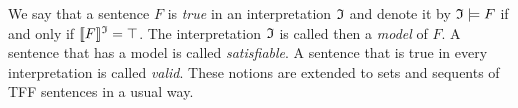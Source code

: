 We say that a sentence $F$ is {\em true} in an interpretation $\mathfrak{I}$
and denote it by $\mathfrak{I} \models F$ if and only if $\llbracket F\rrbracket^{\mathfrak{I}} = \top$.
The interpretation $\mathfrak{I}$ is called then a {\em model\/} of $F$.
A sentence that has a model is called {\em satisfiable}.
A sentence that is true in every interpretation is called {\em valid}.
These notions are extended to sets and sequents of TFF sentences in
a usual way.


